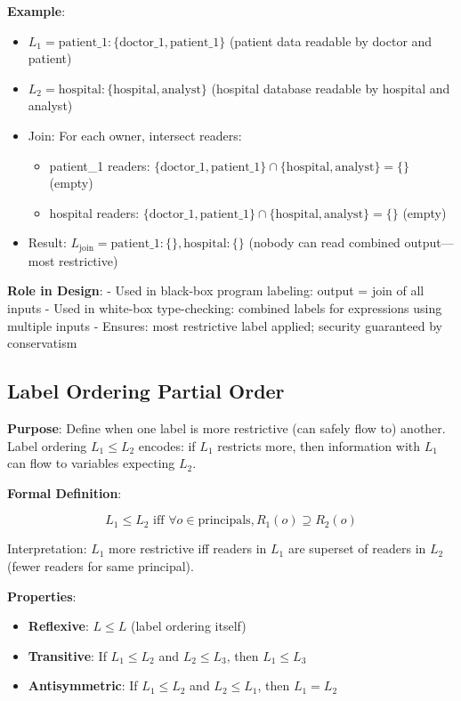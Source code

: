 \textbf{Example}:
\begin{itemize}
\item $L_1 = \text{patient\_1}: \{\text{doctor\_1}, \text{patient\_1}\}$ (patient data readable by doctor and patient)
\item $L_2 = \text{hospital}: \{\text{hospital}, \text{analyst}\}$ (hospital database readable by hospital and analyst)
\item Join: For each owner, intersect readers:
  \begin{itemize}
  \item patient\_1 readers: $\{\text{doctor\_1}, \text{patient\_1}\} \cap \{\text{hospital}, \text{analyst}\} = \{\}$ (empty)
  \item hospital readers: $\{\text{doctor\_1}, \text{patient\_1}\} \cap \{\text{hospital}, \text{analyst}\} = \{\}$ (empty)
  \end{itemize}
\item Result: $L_{\text{join}} = \text{patient\_1}: \{\}, \text{hospital}: \{\}$ (nobody can read combined output—most restrictive)
\end{itemize}

\textbf{Role in Design}:
- Used in black-box program labeling: output = join of all inputs
- Used in white-box type-checking: combined labels for expressions using multiple inputs
- Ensures: most restrictive label applied; security guaranteed by conservatism

\subsection{Label Ordering Partial Order}

\textbf{Purpose}: Define when one label is more restrictive (can safely flow to) another. Label ordering $L_1 \leq L_2$ encodes: if $L_1$ restricts more, then information with $L_1$ can flow to variables expecting $L_2$.

\textbf{Formal Definition}:

\begin{equation}
L_1 \leq L_2 \text{ iff } \forall o \in \text{principals}, R_1(o) \supseteq R_2(o)
\end{equation}

Interpretation: $L_1$ more restrictive iff readers in $L_1$ are superset of readers in $L_2$ (fewer readers for same principal).

\textbf{Properties}:
\begin{itemize}
\item \textbf{Reflexive}: $L \leq L$ (label ordering itself)
\item \textbf{Transitive}: If $L_1 \leq L_2$ and $L_2 \leq L_3$, then $L_1 \leq L_3$
\item \textbf{Antisymmetric}: If $L_1 \leq L_2$ and $L_2 \leq L_1$, then $L_1 = L_2$
\end{itemize}

